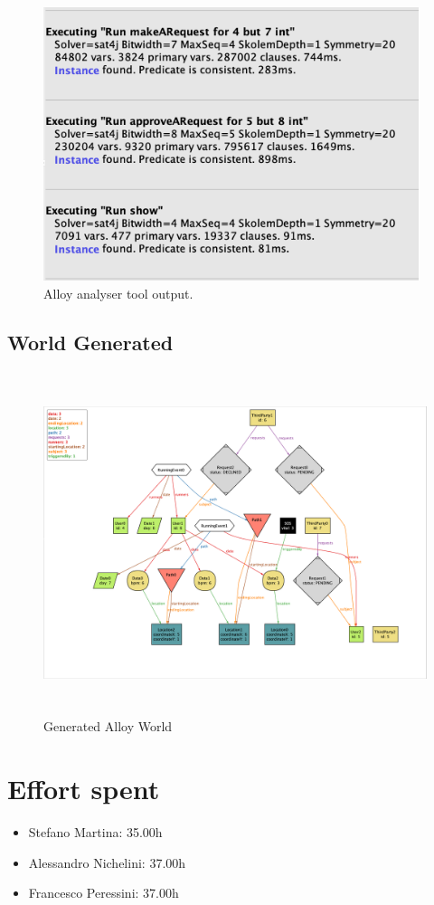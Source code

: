\documentclass{article}
\begin{document}
\begin{figure}[!h]
	\centering
	\includegraphics[height=8cm,keepaspectratio]{Figures/AlloyPredicates}
	\caption{Alloy analyser tool output.}
\end{figure}
\newpage


\subsection{World Generated}
\begin{figure}[ht]
\centering
    \includegraphics[height=10cm,keepaspectratio, angle=270]{Figures/AlloyWorld}
    \caption{Generated Alloy World}
\end{figure}

\newpage
\section{Effort spent}

\begin{itemize}
	\item Stefano Martina: 35.00h
	\item Alessandro Nichelini: 37.00h
	\item Francesco Peressini: 37.00h
\end{itemize}
\end{document}
